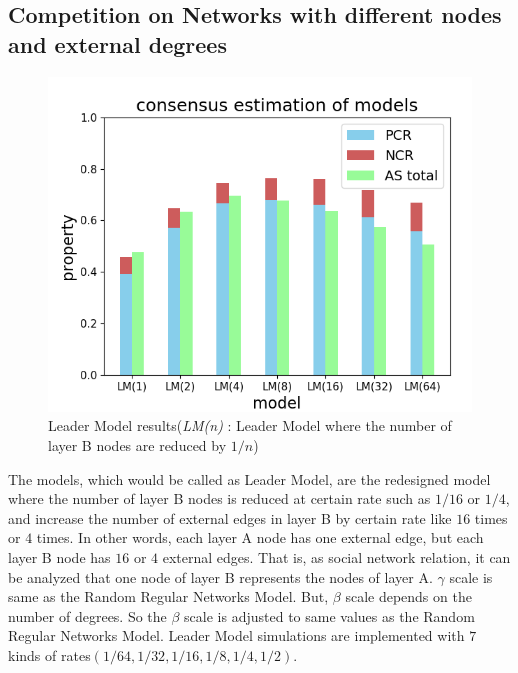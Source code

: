 \documentclass[english]{cccconf}
\begin{document}
\subsection{Competition on Networks with different nodes and external degrees}
\begin{figure}[!htb]
	\centering
	\includegraphics[width=\hsize]{FIG5.png}
	\caption{Leader Model results(\textit{LM(n)} : Leader Model where the number of layer B nodes are reduced by $1/n$)}
	\label{Fig5}
\end{figure}
The models, which would be called as Leader Model, are the redesigned model where the number of layer B nodes is reduced at certain rate such as $1/16$ or $1/4$, and increase the number of external edges in layer B by certain rate like $16$ times or $4$ times. In other words, each layer A node has one external edge, but each layer B node has $16$ or $4$ external edges. That is, as social network relation, it can be analyzed that one node of layer B represents the nodes of layer A. $\gamma$ scale is same as the Random Regular Networks Model. But, $\beta$ scale depends on the number of degrees. So the $\beta$ scale is adjusted to same values as the Random Regular Networks Model. Leader Model simulations are implemented with $7$ kinds of rates$(1/64, 1/32, 1/16, 1/8, 1/4, 1/2)$. 
\end{document}
